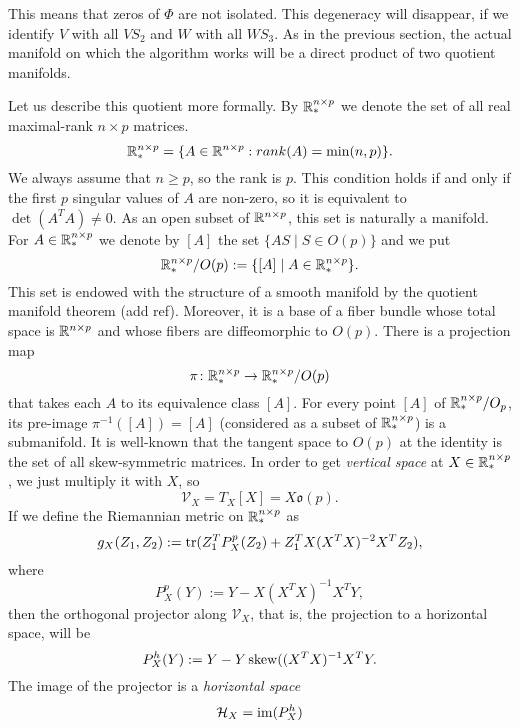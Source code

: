 This means that zeros 
of $\Phi$ are not isolated. This degeneracy will disappear, if
we identify $V$ with all $VS_2$
and $W$ with all $WS_3$. As in the previous section, the actual manifold
on which the algorithm works will be a direct product of two quotient manifolds.



Let us describe this quotient more formally.  
By $\mathbb{R}^{n\times p}_{*}$ we denote the set of all real maximal-rank $n \times p$ matrices.
\begin{equation}
    \mathbb{R}^{n \times p}_{*} = \{ A \in \mathbb{R}^{n \times p} : rank(A) = \min(n,p) \}.
\end{equation}
We always assume that $n \geq p$, so the rank is $p$. This condition holds if and only if
the first $p$ singular values of $A$ are non-zero, so it is equivalent to $\det(A^TA) \neq 0$.
As an open subset of $\mathbb{R}^{n \times p}$, this set is naturally a manifold.
For $A \in \mathbb{R}^{n \times p}_{*}$ we denote by $[A]$ the set 
$\{ AS \mid S \in O(p) \}$ and we put
\begin{equation}
    \mathbb{R}^{n \times p}_{*} / O(p) := \{ [A] \mid A \in \mathbb{R}^{n \times p}_{*} \}.
\end{equation}
This set is endowed with the structure of a smooth manifold by the quotient manifold
theorem (add ref). Moreover, it is a base of a fiber bundle whose total space
is $\mathbb{R}^{n \times p}$ and whose fibers are diffeomorphic to $O(p)$.
There is a projection map
\begin{equation}
    \pi \colon \mathbb{R}^{n \times p}_{*} \to \mathbb{R}^{n \times p}_{*} / O(p)
\end{equation}
that takes each $A$ to its equivalence class $[A]$. For every point $[A]$ of $\mathbb{R}^{n \times p}_{*} / O_p$, its pre-image
$\pi^{-1}( [A] ) = [A]$ (considered as a subset of $\mathbb{R}^{n \times p}_{*}$) is a submanifold.
It is well-known that the tangent space to $O(p)$ at the identity is
the set of all skew-symmetric matrices. In order to get \textit{vertical space}
at $X \in \mathbb{R}^{n \times p}_{*}$, we just multiply it with $X$, so
\begin{equation}
    \mathcal{V}_X = T_X[X] = X \mathfrak{o}(p).
\end{equation}
If we define the Riemannian metric on $\mathbb{R}^{n \times p}_{*}$ as
\begin{equation}
    g_X(Z_1, Z_2) := \operatorname*{tr}(Z_1^T P^p_X(Z_2) + Z_1^T X (X^T X)^{-2} X^T Z_2),
\end{equation}
where 
\begin{equation}
    P^p_X(Y) := Y - X(X^TX)^{-1}X^T Y,
\end{equation}
then the orthogonal projector along $\mathcal{V}_X$, that is, the projection to a horizontal space,
will be 
\begin{equation}
    P^h_X(Y) := Y - Y \operatorname*{skew} ((X^TX)^{-1} X^T Y.
\end{equation}
The image of the projector is a \textit{horizontal space}
\begin{equation}
    \mathcal{H}_X = \operatorname*{im} (P^h_X)
\end{equation}


